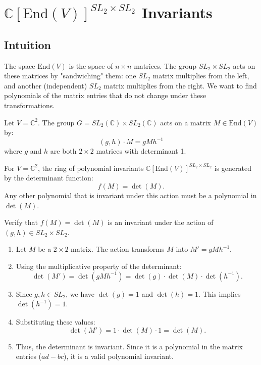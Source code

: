 \section{$\mathbb{C}[\mathrm{End}(V)]^{SL_2 \times SL_2}$ Invariants}

\subsection{Intuition}
The space $\mathrm{End}(V)$ is the space of $n \times n$ matrices. The group $SL_2 \times SL_2$ acts on these matrices by "sandwiching" them: one $SL_2$ matrix multiplies from the left, and another (independent) $SL_2$ matrix multiplies from the right. We want to find polynomials of the matrix entries that do not change under these transformations.

\begin{definition}
Let $V = \mathbb{C}^2$. The group $G = SL_2(\mathbb{C}) \times SL_2(\mathbb{C})$ acts on a matrix $M \in \mathrm{End}(V)$ by:
\[ (g, h) \cdot M = g M h^{-1} \]
where $g$ and $h$ are both $2 \times 2$ matrices with determinant 1.
\end{definition}

\begin{theorem}
For $V = \mathbb{C}^2$, the ring of polynomial invariants $\mathbb{C}[\mathrm{End}(V)]^{SL_2 \times SL_2}$ is generated by the determinant function:
\[ f(M) = \det(M). \]
Any other polynomial that is invariant under this action must be a polynomial in $\det(M)$.
\end{theorem}

\begin{example}
Verify that $f(M) = \det(M)$ is an invariant under the action of $(g, h) \in SL_2 \times SL_2$.
\begin{enumerate}
    \item Let $M$ be a $2 \times 2$ matrix. The action transforms $M$ into $M' = g M h^{-1}$.
    \item Using the multiplicative property of the determinant:
    \[ \det(M') = \det(g M h^{-1}) = \det(g) \cdot \det(M) \cdot \det(h^{-1}). \]
    \item Since $g, h \in SL_2$, we have $\det(g) = 1$ and $\det(h) = 1$. This implies $\det(h^{-1}) = 1$.
    \item Substituting these values:
    \[ \det(M') = 1 \cdot \det(M) \cdot 1 = \det(M). \]
    \item Thus, the determinant is invariant. Since it is a polynomial in the matrix entries ($ad-bc$), it is a valid polynomial invariant.
\end{enumerate}
\end{example}

